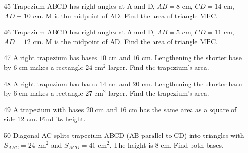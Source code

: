 \gap
\begin{probbox}{45}{}
Trapezium ABCD has right angles at A and D, $AB=8$ cm, $CD=14$ cm, $AD=10$ cm. M is the midpoint of AD. Find the area of triangle MBC.
\end{probbox}
\gap
\begin{probbox}{46}{}
Trapezium ABCD has right angles at A and D, $AB=5$ cm, $CD=11$ cm, $AD=12$ cm. M is the midpoint of AD. Find the area of triangle MBC.
\end{probbox}
\gap
\begin{probbox}{47}{}
A right trapezium has bases $10$ cm and $16$ cm. Lengthening the shorter base by $6$ cm makes a rectangle $24$ cm$^2$ larger. Find the trapezium's area.
\end{probbox}
\gap
\begin{probbox}{48}{}
A right trapezium has bases $14$ cm and $20$ cm. Lengthening the shorter base by $6$ cm makes a rectangle $27$ cm$^2$ larger. Find the trapezium's area.
\end{probbox}
\gap
\begin{probbox}{49}{}
A trapezium with bases $20$ cm and $16$ cm has the same area as a square of side $12$ cm. Find its height.
\end{probbox}
\gap
\begin{probbox}{50}{}
Diagonal AC splits trapezium ABCD (AB parallel to CD) into triangles with $S_{ABC}=24$ cm$^2$ and $S_{ACD}=40$ cm$^2$. The height is $8$ cm. Find both bases.
\end{probbox}
